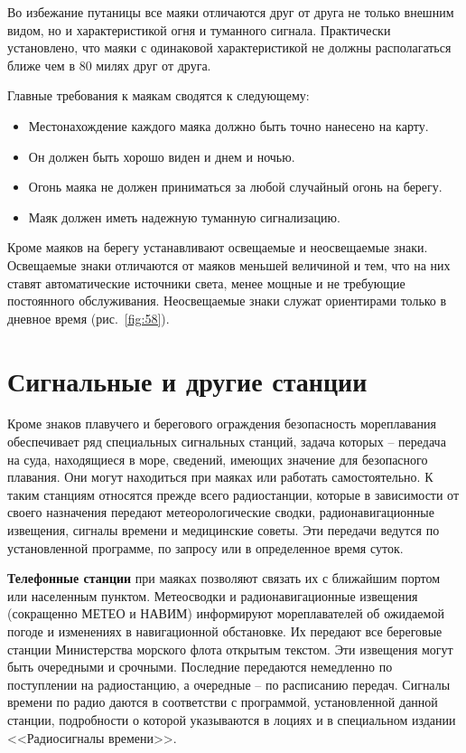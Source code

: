 \documentclass[a4paper, 12pt, twoside, final, book, russian, fittopage, cyremdash]{ncc}
\newcommand{\ris}[1]{\ref{fig:#1}}
\begin{document}
Во избежание путаницы все маяки отличаются друг от друга не только внешним видом, но и характеристикой огня и туманного сигнала. Практически установлено, что маяки с одинаковой характеристикой не должны располагаться ближе чем в 80 милях друг от друга.

Главные требования к маякам сводятся к следующему: 

\begin{itemize}
\item Местонахождение каждого маяка должно быть точно нанесено на карту. 
\item Он должен быть хорошо виден и днем и ночью. 
\item Огонь маяка не должен приниматься за любой случайный огонь на берегу. 
\item Маяк должен иметь надежную туманную сигнализацию. 
\end{itemize}

Кроме маяков на берегу устанавливают освещаемые и неосвещаемые знаки. Освещаемые знаки отличаются от маяков меньшей величиной и тем, что на них ставят автоматические источники света, менее мощные и не требующие постоянного обслуживания. Неосвещаемые знаки служат ориентирами только в дневное время (рис.~\ris{58}). 

\section{Сигнальные и другие станции}

Кроме знаков плавучего и берегового ограждения безопасность мореплавания обеспечивает ряд специальных сигнальных станций, задача которых \--- передача на суда, находящиеся в море, сведений, имеющих значение для безопасного плавания. Они могут находиться при маяках или работать самостоятельно. К таким станциям относятся прежде всего радиостанции, которые в зависимости от своего назначения передают метеорологические сводки, радионавигационные извещения, сигналы времени и медицинские советы. Эти передачи ведутся по установленной программе, по запросу или в определенное время суток. 

\textbf{Телефонные станции} при маяках позволяют связать их с ближайшим портом или населенным пунктом.
Метеосводки и радионавигационные извещения (сокращенно МЕТЕО и НАВИМ) информируют мореплавателей об ожидаемой погоде и изменениях в навигационной обстановке. Их передают все береговые станции Министерства морского флота открытым текстом. Эти извещения могут быть очередными и срочными. Последние передаются немедленно по поступлении на радиостанцию, а очередные \--- по расписанию передач. Сигналы времени по радио даются в соответстви с программой, установленной данной станции, подробности о которой указываются в лоциях и в специальном издании <<Радиосигналы времени>>.
\end{document}
